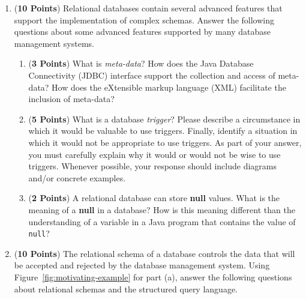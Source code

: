 \documentclass[12pt]{article}
\begin{document}
\begin{enumerate}
\begin{enumerate}
            \end{enumerate}

            \newpage

          \item ({\bf 10 Points}) Relational databases contain several advanced features that support the implementation
            of complex schemas.  Answer the following questions about some advanced features supported by many database
            management systems.

            \begin{enumerate}

              \item ({\bf 3 Points}) What is {\em meta-data}?  How does the Java Database Connectivity (JDBC) interface
                support the collection and access of meta-data?  How does the eXtensible markup language (XML)
                facilitate the inclusion of meta-data?


                \item ({\bf 5 Points}) What is a database {\em trigger}?  Please describe a circumstance in which it
                  would be valuable to use triggers.  Finally, identify a situation in which it would not be appropriate
                  to use triggers.  As part of your answer, you must carefully explain why it would or would not be wise
                  to use triggers.  Whenever possible, your response should include diagrams and/or concrete examples.

                \item ({\bf 2 Points}) A relational database can store {\bf null} values.  What is the meaning of a {\bf
                  null} in a database?  How is this meaning different than the understanding of a variable
                  in a Java program that contains the value of {\tt null}?

              \end{enumerate}

              \newpage

            \item ({\bf 10 Points}) The relational schema of a database controls
              the data that will be accepted and rejected by the database
              management system.  Using Figure~\ref{fig:motivating-example} for
              part (a), answer the following questions about relational schemas
              and the structured query language.


\end{enumerate}
\end{document}
